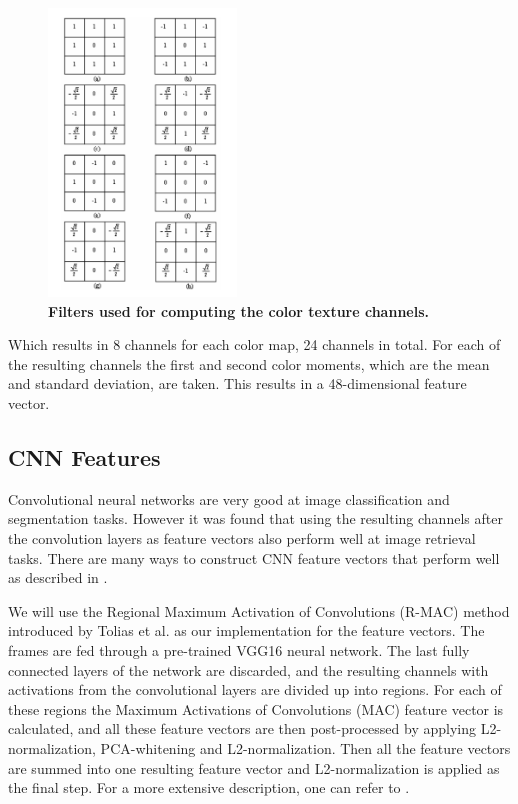 \documentclass{article}
\begin{document}
\begin{figure}[H]
	\includegraphics[width=5cm]{images/filters.png}
	\centering
	\caption{\textbf{Filters used for computing the color texture channels.}}
	\label{fig:filters}
\end{figure}

Which results in 8 channels for each color map, 24 channels in total. For each of the resulting channels the first and second color moments, which are the mean and standard deviation, are taken. This results in a 48-dimensional feature vector.

\subsection{CNN Features} 
Convolutional neural networks are very good at image classification and segmentation tasks. However it was found that using the resulting channels after the convolution layers as feature vectors also perform well at image retrieval tasks. There are many ways to construct CNN feature vectors that perform well as described in \cite{zheng2018sift}.

We will use the Regional Maximum Activation of Convolutions (R-MAC) method introduced by Tolias et al. \cite{tolias2015particular} as our implementation for the feature vectors. The frames are fed through a pre-trained VGG16 neural network. The last fully connected layers of the network are discarded, and the resulting channels with activations from the convolutional layers are divided up into regions. For each of these regions the Maximum Activations of Convolutions (MAC) feature vector is calculated, and all these feature vectors are then post-processed by applying L2-normalization, PCA-whitening and L2-normalization. Then all the feature vectors are summed into one resulting feature vector and L2-normalization is applied as the final step. For a more extensive description, one can refer to \cite{tolias2015particular}.
\end{document}
